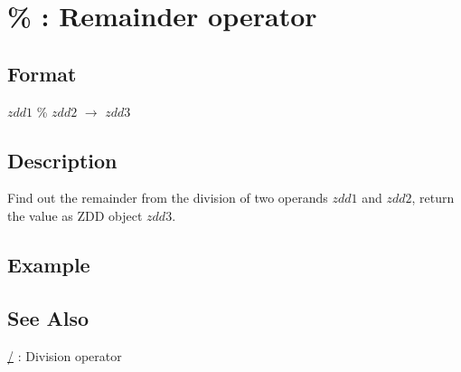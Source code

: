 
\section{\% : Remainder operator\label{sect:remainder}}
\subsection*{Format}
$zdd1$ \% $zdd2$ $\rightarrow$ $zdd3$

\subsection*{Description}
Find out the remainder from the division of two operands $zdd1$ and $zdd2$, return the value as ZDD object $zdd3$. 

\subsection*{Example}


\subsection*{See Also}
\hyperref[sect:quotiment]{/} : Division operator
